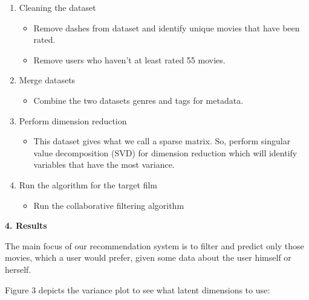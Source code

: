 \documentclass{article}
\begin{document}
\begin{enumerate}

    \item Cleaning the dataset
        \begin{itemize}
          \item Remove dashes from dataset and identify unique movies that have been rated. 
          \item Remove users who haven’t at least rated 55 movies.
        \end{itemize}
    
    \item Merge datasets
        \begin{itemize}
          \item Combine the two datasets genres and tags for metadata.  
        \end{itemize}
        
    \item Perform dimension reduction
        \begin{itemize}
          \item This dataset gives what we call a sparse matrix. So, perform singular value decomposition (SVD) for dimension reduction which will identify variables that have the most variance.  
        \end{itemize}
        
    \item Run the algorithm for the target film
        \begin{itemize}
          \item Run the collaborative filtering algorithm
        \end{itemize}
        
\end{enumerate}

\begin{center}
\end{center}

\begin{flushleft}
\textbf{\large 4. Results}
\end{flushleft}

The main focus of our recommendation system is to filter and predict only those movies, which a user would prefer, given some data about the user himself or herself.

\begin{flushleft}
Figure 3 depicts the variance plot to see what latent dimensions to use:
\end{flushleft}
\end{document}
